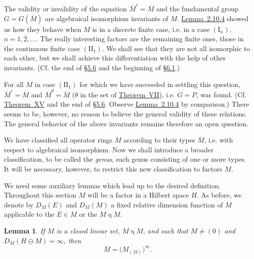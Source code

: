 \documentclass[b5paper,twoside]{article}
\newcommand{\secref}[2]{\hyperref[#1]{\mbox{\S#2}}}
\newcommand{\thmref}[2]{\hyperref[#1]{\mbox{Theorem~#2}}}
\newcommand{\lemref}[2]{\hyperref[#1]{\mbox{Lemma~#2}}}
\theoremstyle{mvnplain}
\newtheorem{lemma}{Lemma}[section]
\newcommand{\M}{\mathbf M}
\newcommand{\Hilbert}{\mathfrak H}
\def\M{M}%
\def\Hilbert{H}%
\def\mathfrak#1{#1}%
\begin{document}
The validity or invalidity of the equation
$\overline{\M}^{c}=\overline{\M}$ and the fundamental group
$\mathfrak G=\mathfrak G(\overline{\M})$ are algebraical isomorphism
invariants of $\M$.  \lemref{lem:2.10.4}{2.10.4} showed us how they behave
when $\M$ is in a discrete finite case, i.e. in a case $(\mathrm I_n)$,
$n=1,2,\ldots$.  The really interesting factors are the remaining finite
ones, those in the continuous finite case $(\mathrm{II}_1)$.  We shall see
that they are not all isomorphic to each other, but we shall achieve this
differentiation with the help of other invariants.  (Cf. the end of
\secref{sec:5.6}{5.6} and the beginning of \secref{sec:6.1}{6.1}.)

For all $\M$ in case $(\mathrm{II}_1)$ for which we have succeeded in
settling this question, $\overline{\M}^{c}=\overline{\M}$ and
$\overline{\M}^{\theta}=\overline{\M}$ ($\theta$ in the set of
\thmref{thm:VII}{VII}), i.e. $\mathfrak G=P$, was found.  (Cf.
\thmref{thm:XV}{XV} and the end of \secref{sec:5.6}{5.6}.  Observe
\lemref{lem:2.10.4}{2.10.4} by comparison.)  There seems to be, however, no
reason to believe the general validity of these relations.  The general
behavior of the above invariants remains therefore an open question.


We have classified all operator rings \(\M\) according to their types
\(\overline{\M}\), i.e. with respect to algebraical isomorphism. Now we shall
introduce a broader classification, to be called the \emph{genus}, each genus
consisting of one or more types. It will be necessary, however, to restrict this
new classification to factors \(\M\).

We need some auxiliary lemmas which lead up to the desired definition.
Throughout this section \(\M\) will be a factor in a Hilbert space \(\Hilbert\).
As before, we denote by \(D_{\M}(E)\) and \(D_{\M}(\mathfrak M)\) a fixed
relative dimension function of \(\M\) applicable to the \(E\in\M\) or the
\(\mathfrak M\mathrel{\eta}\M\).

\begin{lemma}\label{lem:3.1.1}
If \(\mathfrak M\) is a closed linear set, \(\mathfrak M\mathrel{\eta}\M\), and such
that \(\mathfrak M\ne(0)\) and
\(D_{\M}(\Hilbert\ominus\mathfrak M)=\infty\), then
\[
  \overline{\M}=\bigl(\overline{\M_{(\mathfrak M)}}\bigr)^{\infty}.
\]
\end{lemma}
\end{document}
